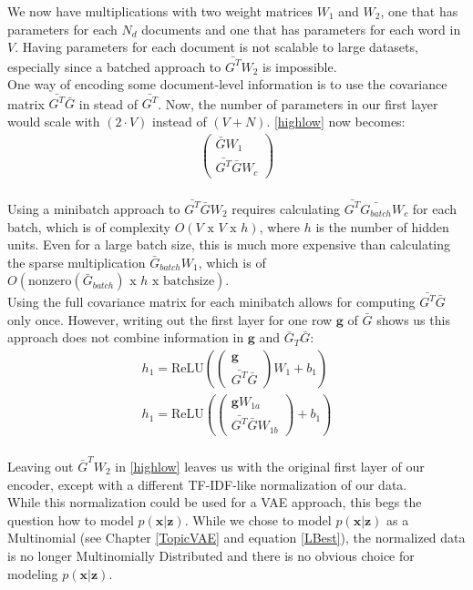 \documentclass{report}
\begin{document}
	We now have multiplications with two weight matrices $W_1$ and $W_2$, one that has parameters for each $N_d$ documents and one that has parameters for each word in $V$. Having parameters for each document is not scalable to large datasets, especially since a batched approach to $\bar{G^T}W_2$ is impossible.\\
	One way of encoding some document-level information is to use the covariance matrix $\bar{G^T}\bar{G}$ in stead of $\bar{G^T}$. Now, the number of parameters in our first layer would scale with $(2\cdot V)$ instead of $(V+N)$. \ref{highlow} now becomes:
	\\
	\begin{align}
	\left(\begin{matrix}
	\bar{G}W_1 \\
	\bar{G^T}\bar{G}W_c
	\end{matrix}\right)
	\end{align}
	\\
	Using a minibatch approach to $\bar{G^T}\bar{G}W_2$ requires calculating $\bar{G^T}\bar{G_{batch}}W_c$ for each batch, which is of complexity $O(V\text{ x }V \text{ x } h)$, where $h$ is the number of hidden units. Even for a large batch size, this is much more expensive than calculating the sparse multiplication $\bar{G}_{batch}W_1$, which is of $O(\text{nonzero}(\bar{G}_{batch}) \text{ x } h \text{ x } \text{batchsize})$. 
	\\
	Using the full covariance matrix for each minibatch allows for computing $\bar{G^T}\bar{G}$ only once. However, writing out the first layer for one row $\mathbf{g}$ of $\bar{G}$ shows us this approach does not combine information in $\mathbf{g}$ and $\bar{G}_T\bar{G}$:
	\begin{align}
	h_1 = \text{ReLU}(
	\left(\begin{matrix}
	\mathbf{g} \\
	\bar{G^T}\bar{G}
	\end{matrix}\right)W_1 +b_1)
	\\
	h_1 = 
	\text{ReLU}(\left(\begin{matrix}
	\mathbf{g}W_{1a} \\
	\bar{G^T}\bar{G}W_{1b}
	\end{matrix}\right) + b_1)
	\end{align}
	\\
	Leaving out $\bar{G}^TW_2$ in \ref{highlow} leaves us with the original first layer of our encoder, except with a different TF-IDF-like normalization of our data. \\ While this normalization could be used for a VAE approach, this begs the question how to model $p(\mathbf{x|z})$. While we chose to model $p(\mathbf{x|z})$ as a Multinomial (see Chapter \ref{TopicVAE} and equation \ref{LBest}), the normalized data is no longer Multinomially Distributed and there is no obvious choice for modeling $p(\mathbf{x|z})$.
\end{document}
